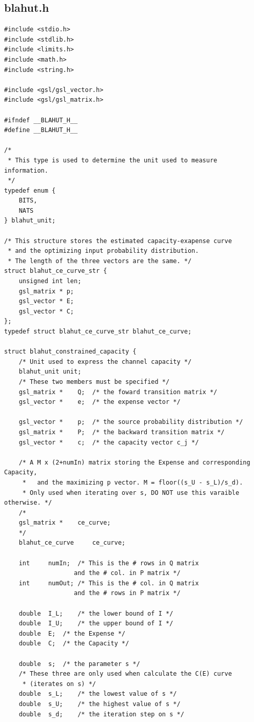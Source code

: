 \documentclass[a4paper,10pt]{article}
\begin{document}
\subsection{blahut.h}
\begin{verbatim}
#include <stdio.h>
#include <stdlib.h>
#include <limits.h>
#include <math.h>
#include <string.h>

#include <gsl/gsl_vector.h>
#include <gsl/gsl_matrix.h>

#ifndef __BLAHUT_H__
#define __BLAHUT_H__

/*
 * This type is used to determine the unit used to measure information.
 */
typedef enum {
    BITS, 
    NATS
} blahut_unit;

/* This structure stores the estimated capacity-exapense curve
 * and the optimizing input probability distribution.
 * The length of the three vectors are the same. */
struct blahut_ce_curve_str {
    unsigned int len;
    gsl_matrix * p;
    gsl_vector * E;
    gsl_vector * C;
};
typedef struct blahut_ce_curve_str blahut_ce_curve;

struct blahut_constrained_capacity {
    /* Unit used to express the channel capacity */
    blahut_unit	unit;
    /* These two members must be specified */
    gsl_matrix *	Q;	/* the foward transition matrix */
    gsl_vector *	e;	/* the expense vector */

    gsl_vector *	p;	/* the source probability distribution */
    gsl_matrix *	P;	/* the backward transition matrix */
    gsl_vector *	c;	/* the capacity vector c_j */

    /* A M x (2+numIn) matrix storing the Expense and corresponding Capacity, 
     *   and the maximizing p vector. M = floor((s_U - s_L)/s_d). 
     * Only used when iterating over s, DO NOT use this varaible otherwise. */
    /*
    gsl_matrix *	ce_curve;	
    */
    blahut_ce_curve 	ce_curve;

    int		numIn;	/* This is the # rows in Q matrix
				   and the # col. in P matrix */
    int 	numOut;	/* This is the # col. in Q matrix 
				   and the # rows in P matrix */

    double 	I_L;	/* the lower bound of I */
    double 	I_U;	/* the upper bound of I */
    double 	E;	/* the Expense */
    double 	C;	/* the Capacity */

    double 	s;	/* the parameter s */
    /* These three are only used when calculate the C(E) curve 
     * (iterates on s) */
    double	s_L;	/* the lowest value of s */
    double 	s_U;	/* the highest value of s */
    double 	s_d;	/* the iteration step on s */



\end{verbatim}
\end{document}
